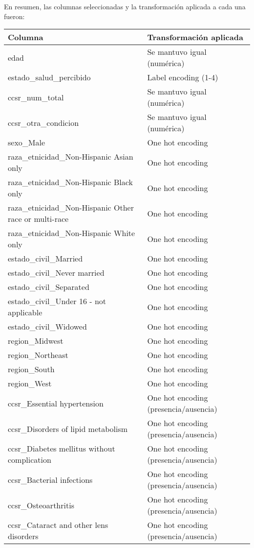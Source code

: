\documentclass[12pt,a4paper]{article}
\begin{document}
\begin{itemize}
En resumen, las columnas seleccionadas y la transformación aplicada a cada una fueron:

\begin{table}[H]
\centering
\begin{tabular}{ll}
\toprule
\textbf{Columna} & \textbf{Transformación aplicada} \\
\midrule
edad & Se mantuvo igual (numérica) \\
estado\_salud\_percibido & Label encoding (1-4) \\
ccsr\_num\_total & Se mantuvo igual (numérica) \\
ccsr\_otra\_condicion & Se mantuvo igual (numérica) \\
sexo\_Male & One hot encoding \\
raza\_etnicidad\_Non-Hispanic Asian only & One hot encoding \\
raza\_etnicidad\_Non-Hispanic Black only & One hot encoding \\
raza\_etnicidad\_Non-Hispanic Other race or multi-race & One hot encoding \\
raza\_etnicidad\_Non-Hispanic White only & One hot encoding \\
estado\_civil\_Married & One hot encoding \\
estado\_civil\_Never married & One hot encoding \\
estado\_civil\_Separated & One hot encoding \\
estado\_civil\_Under 16 - not applicable & One hot encoding \\
estado\_civil\_Widowed & One hot encoding \\
region\_Midwest & One hot encoding \\
region\_Northeast & One hot encoding \\
region\_South & One hot encoding \\
region\_West & One hot encoding \\
ccsr\_Essential hypertension & One hot encoding (presencia/ausencia) \\
ccsr\_Disorders of lipid metabolism & One hot encoding (presencia/ausencia) \\
ccsr\_Diabetes mellitus without complication & One hot encoding (presencia/ausencia) \\
ccsr\_Bacterial infections & One hot encoding (presencia/ausencia) \\
ccsr\_Osteoarthritis & One hot encoding (presencia/ausencia) \\
ccsr\_Cataract and other lens disorders & One hot encoding (presencia/ausencia) \\

\end{tabular}
\end{table}
\end{itemize}
\end{document}
